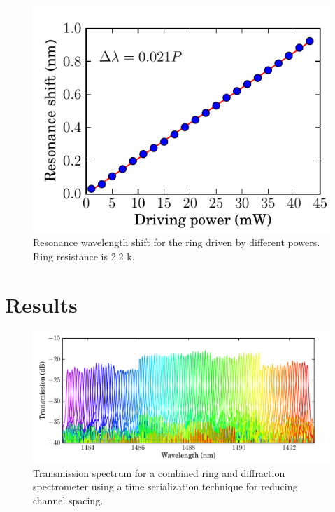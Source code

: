 \documentclass[12pt,twoside,english]{book}
\renewcommand{\~}{\perispomeni}%
\DeclareRobustCommand{\textgreek}[1]{\leavevmode{\greektext #1}}
\numberwithin{equation}{section}
\numberwithin{figure}{section}
\begin{document}
\begin{figure}[H]
	\begin{minipage}[t]{0.49\columnwidth}%
		\includegraphics{ring-cal-fit}
		\caption{Resonance wavelength shift for the ring driven by different powers. Ring resistance is 2.2 k\textgreek{W}.}
		\label{fig:resonance shift resistance}
	\end{minipage}
\end{figure}

\section{Results}
\begin{figure}[H]
\noindent \centering{}
\includegraphics{graphs/hundred}
\caption{Transmission spectrum for a combined ring and diffraction spectrometer using a time serialization technique for reducing channel spacing.}
\label{fig:Transmission spectrum}
\end{figure}
\end{document}
